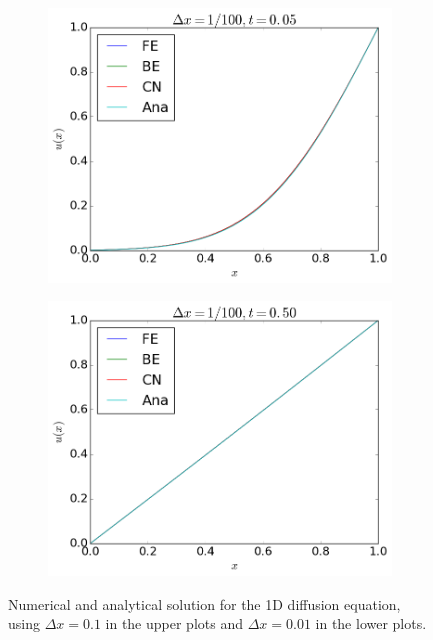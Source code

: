 \documentclass[12pt, a4paper]{article}
\begin{document}
\begin{figure}[ht!]
\begin{subfigure}[b]{0.495\textwidth}
		\includegraphics[width=\textwidth]{../Programs/Output/Diffusion_1d_99_t1.png}
  	\end{subfigure}
  	\begin{subfigure}[b]{0.495\textwidth}
		\includegraphics[width=\textwidth]{../Programs/Output/Diffusion_1d_99_t2.png}
  	\end{subfigure}
  	\caption{Numerical and analytical solution for the 1D diffusion equation, using $\Delta x = 0.1$ 
  	in the upper plots and $\Delta x = 0.01$ in the lower plots.}
  	\label{fig:1d}	
\end{figure}
\end{document}
